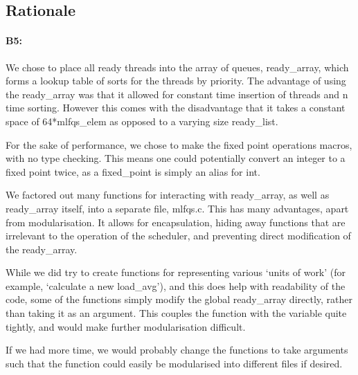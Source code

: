 \subsection{Rationale}
\paragraph{B5:} %

We chose to place all ready threads into the array of queues, ready\_array, which forms a lookup table of sorts for the threads by priority. The advantage of using the ready\_array 
was that it allowed for constant time insertion of threads and n time sorting. However this comes with the disadvantage that it takes a constant space of 64*mlfqs\_elem as opposed to a
varying size ready\_list. 

For the sake of performance, we chose to make the fixed point operations macros,
with no type checking. This means one could potentially convert an integer to a
fixed point twice, as a fixed\_point is simply an alias for int.

We factored out many functions for interacting with ready\_array, as well as
ready\_array itself, into a separate file, mlfqs.c. This has many advantages,
apart from modularisation. It allows for encapsulation, hiding away functions
that are irrelevant to the operation of the scheduler, and preventing direct
modification of the ready\_array.

While we did try to create functions for representing various `units of work'
(for example, `calculate a new load\_avg'), and this does help with readability
of the code, some of the functions simply modify the global ready\_array
directly, rather than taking it as an argument. This couples the function with
the variable quite tightly, and would make further modularisation difficult.

If we had more time, we would probably change the functions to take arguments
such that the function could easily be modularised into different files if
desired.

